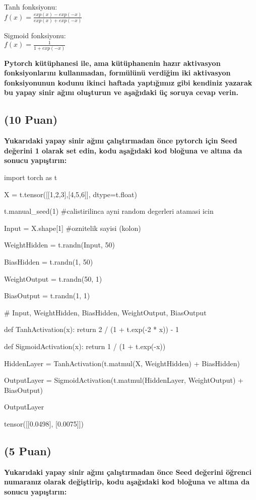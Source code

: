 \documentclass[11pt]{article}
\begin{document}
Tanh fonksiyonu:\\
$f(x) = \frac{exp(x) - exp(-x)}{exp(x) + exp(-x)}$
\vspace{.2in}

Sigmoid fonksiyonu:\\
$f(x) = \frac{1}{1 + exp(-x)}$

\vspace{.2in}
 \textbf{Pytorch kütüphanesi ile, ama kütüphanenin hazır aktivasyon fonksiyonlarını kullanmadan, formülünü verdiğim iki aktivasyon fonksiyonunun kodunu ikinci haftada yaptığımız gibi kendiniz yazarak bu yapay sinir ağını oluşturun ve aşağıdaki üç soruya cevap verin.}
 
\subsection{(10 Puan)} \textbf{Yukarıdaki yapay sinir ağını çalıştırmadan önce pytorch için Seed değerini 1 olarak set edin, kodu aşağıdaki kod bloğuna ve altına da sonucu yapıştırın:}

\begin{python}
import torch as t

X = t.tensor([[1,2,3],[4,5,6]], dtype=t.float)

t.manual_seed(1) #calistirilinca ayni random degerleri atamasi icin

Input = X.shape[1] #oznitelik sayisi (kolon)

WeightHidden = t.randn(Input, 50)

BiasHidden = t.randn(1, 50)

WeightOutput = t.randn(50, 1)

BiasOutput = t.randn(1, 1)

# Input, WeightHidden, BiasHidden, WeightOutput, BiasOutput

def TanhActivation(x):
    return 2 / (1 + t.exp(-2 * x)) - 1

def SigmoidActivation(x):
    return 1 / (1 + t.exp(-x))

HiddenLayer = TanhActivation(t.matmul(X, WeightHidden) + BiasHidden)

OutputLayer = SigmoidActivation(t.matmul(HiddenLayer, WeightOutput) + BiasOutput)

OutputLayer
\end{python}

tensor([[0.0498],
        [0.0075]])

\subsection{(5 Puan)} \textbf{Yukarıdaki yapay sinir ağını çalıştırmadan önce Seed değerini öğrenci numaranız olarak değiştirip, kodu aşağıdaki kod bloğuna ve altına da sonucu yapıştırın:}
\end{document}
